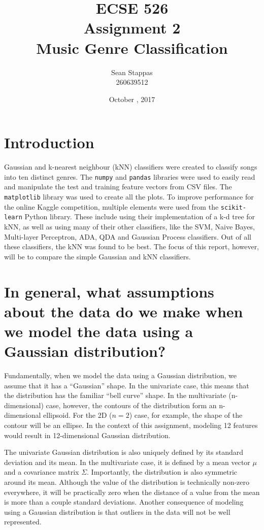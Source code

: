 \documentclass[a4paper,titlepage]{article}
\title{
	\textbf{ECSE 526 \\ Assignment 2}
	\\ \large Music Genre Classification
}
\author{Sean Stappas \\ 260639512}
\date{October \nth{19}, 2017}
\begin{document}
	\sloppy
	\maketitle
	\twocolumn
	
	\section*{Introduction}
	
	Gaussian and k-nearest neighbour (kNN) classifiers were created to classify songs into ten distinct genres. The \texttt{numpy} and \texttt{pandas} libraries were used to easily read and manipulate the test and training feature vectors from CSV files. The \texttt{matplotlib} library was used to create all the plots. To improve performance for the online Kaggle competition, multiple elements were used from the \texttt{scikit-learn} Python library. These include using their implementation of a k-d tree for kNN, as well as using many of their other classifiers, like the SVM, Naive Bayes, Multi-layer Perceptron, ADA, QDA and Gaussian Process classifiers. Out of all these classifiers, the kNN was found to be best. The focus of this report, however, will be to compare the simple Gaussian and kNN classifiers.
	
	\section{In general, what assumptions about the data do we make when we model the data using a Gaussian distribution?}
	
	Fundamentally, when we model the data using a Gaussian distribution, we assume that it has a ``Gaussian'' shape. In the univariate case, this means that the distribution has the familiar ``bell curve'' shape. In the multivariate (n-dimensional) case, however, the contours of the distribution form an n-dimensional ellipsoid. For the 2D ($n=2$) case, for example, the shape of the contour will be an ellipse. In the context of this assignment, modeling 12 features would result in 12-dimensional Gaussian distribution.
	
	The univariate Gaussian distribution is also uniquely defined by its standard deviation and its mean. In the multivariate case, it is defined by a mean vector $\mu$ and a covariance matrix $\Sigma$. Importantly, the distribution is also symmetric around its mean. Although the value of the distribution is technically non-zero everywhere, it will be practically zero when the distance of a value from the mean is more than a couple standard deviations. Another consequence of modeling using a Gaussian distribution is that outliers in the data will not be well represented.
	
\end{document}
